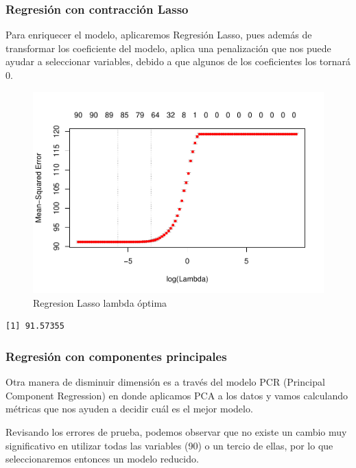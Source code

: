 \documentclass[conference,final,]{IEEEtran}
\begin{document}
\hypertarget{regresion-con-contraccion-lasso}{%
\subsubsection{Regresión con contracción
Lasso}\label{regresion-con-contraccion-lasso}}

Para enriquecer el modelo, aplicaremos Regresión Lasso, pues además de
transformar los coeficiente del modelo, aplica una penalización que nos
puede ayudar a seleccionar variables, debido a que algunos de los
coeficientes los tornará 0.

\begin{figure}[H]

{\centering \includegraphics[width=0.6\linewidth]{YearPrediction_Reporte_files/figure-latex/unnamed-chunk-7-1} 

}

\caption{Regresion Lasso lambda óptima}\label{fig:unnamed-chunk-7}
\end{figure}

\begin{verbatim}
[1] 91.57355
\end{verbatim}

\hypertarget{regresion-con-componentes-principales}{%
\subsubsection{Regresión con componentes
principales}\label{regresion-con-componentes-principales}}

Otra manera de disminuir dimensión es a través del modelo PCR (Principal
Component Regression) en donde aplicamos PCA a los datos y vamos
calculando métricas que nos ayuden a decidir cuál es el mejor modelo.

Revisando los errores de prueba, podemos observar que no existe un
cambio muy significativo en utilizar todas las variables (90) o un
tercio de ellas, por lo que seleccionaremos entonces un modelo reducido.
\end{document}

